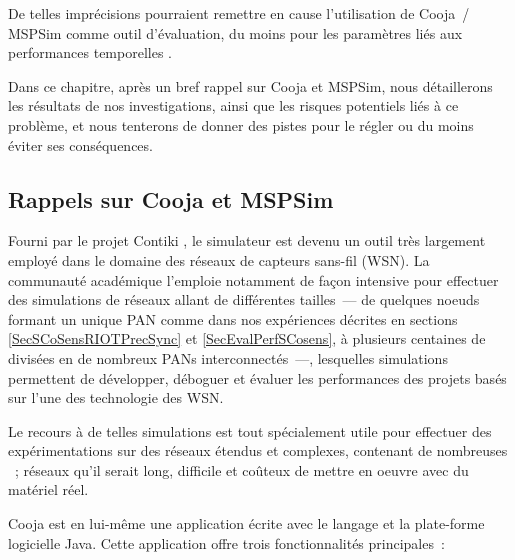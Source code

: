 De telles imprécisions pourraient remettre en cause l'utilisation de
Cooja~/ MSPSim comme outil d'évaluation, du moins pour les paramètres
liés aux performances temporelles \cite{KR-EWSN-NextMote-2016}.

Dans ce chapitre, après un bref rappel sur Cooja et MSPSim, nous détaillerons
les résultats de nos investigations, ainsi que les risques potentiels liés
à ce problème, et nous tenterons de donner des pistes pour le régler
ou du moins éviter ses conséquences.


\subsection{Rappels sur Cooja et MSPSim}
\label{SubsecCoojaMSPSim}

Fourni par le projet Contiki \cite{ContikiOS}, le simulateur 
\cite{Cooja} est devenu un outil très largement employé dans le domaine
des réseaux de capteurs sans-fil (WSN). La communauté académique l'emploie
notamment de façon intensive pour effectuer des simulations de réseaux
allant de différentes tailles~--- de quelques noeuds formant un unique PAN
comme dans nos expériences décrites en sections \vref{SecSCoSensRIOTPrecSync}
et \vref{SecEvalPerfSCosens}, à plusieurs centaines de  divisées
en de nombreux PANs interconnectés~---, lesquelles simulations permettent
de développer, déboguer et évaluer les performances des projets basés sur
l'une des technologie des WSN.

Le recours à de telles simulations est tout spécialement utile pour
effectuer des expérimentations sur des réseaux étendus et complexes,
contenant de nombreuses ~; réseaux qu'il serait long,
difficile et coûteux de mettre en oeuvre avec du matériel réel.

Cooja est en lui-même une application écrite avec le langage et la
plate-forme logicielle Java. Cette application offre trois fonctionnalités
principales~:

